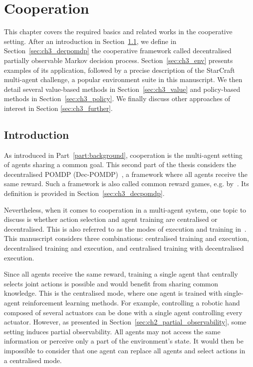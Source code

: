\chapter{Cooperation}\label{ch:cooperation}
\begin{chapter_outline}

This chapter covers the required basics and related works in the cooperative setting.
After an introduction in Section~\ref{sec:ch3_intro}, we define in Section~\ref{sec:ch3_decpomdp} the cooperative framework called decentralised partially observable Markov decision process.
Section~\ref{sec:ch3_env} presents examples of its application, followed by a precise description of the StarCraft multi-agent challenge, a popular environment suite in this manuscript.
We then detail several value-based methods in Section~\ref{sec:ch3_value} and policy-based methods in Section~\ref{sec:ch3_policy}.
We finally discuss other approaches of interest in Section \ref{sec:ch3_further}.
\end{chapter_outline}

\section{Introduction}
\label{sec:ch3_intro}
As introduced in Part~\ref{part:background}, cooperation is the multi-agent setting of agents sharing a common goal.
This second part of the thesis considers the decentralised POMDP (Dec-POMDP)~\citep{DecPomdp}, a framework where all agents receive the same reward.
Such a framework is also called common reward games, e.g. by~\cite{marl-book}.
Its definition is provided in Section~\ref{sec:ch3_decpomdp}.

Nevertheless, when it comes to cooperation in a multi-agent system, one topic to discuss is whether action selection and agent training are centralised or decentralised.
This is also referred to as the modes of execution and training in~\citep{marl-book}.
This manuscript considers three combinations: centralised training and execution, decentralised training and execution, and centralised training with decentralised execution.

Since all agents receive the same reward, training a single agent that centrally selects joint actions is possible and would benefit from sharing common knowledge.
This is the centralised mode, where one agent is trained with single-agent reinforcement learning methods.
For example, controlling a robotic hand composed of several actuators can be done with a single agent controlling every actuator.
However, as presented in Section~\ref{sec:ch2_partial_observability}, some setting induces partial observability.
All agents may not access the same information or perceive only a part of the environment's state.
It would then be impossible to consider that one agent can replace all agents and select actions in a centralised mode.

